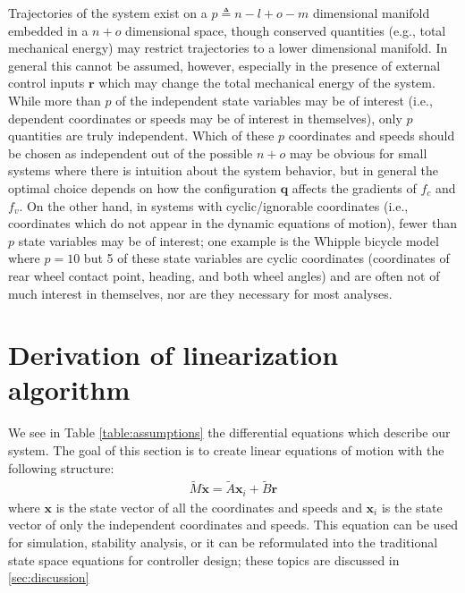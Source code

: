 \documentclass{svjour3}                     %
\begin{document}
Trajectories of the system exist on a $p \triangleq n - l + o - m$ dimensional
manifold embedded in a $n + o$ dimensional space, though conserved quantities
(e.g., total mechanical energy) may restrict trajectories to a lower
dimensional manifold.  In general this cannot be assumed, however, especially
in the presence of external control inputs $\bm{r}$ which may change the total
mechanical energy of the system.  While more than $p$ of the independent state
variables may be of interest (i.e., dependent coordinates or speeds may be of
interest in themselves), only $p$ quantities are truly independent.  Which of
these $p$ coordinates and speeds should be chosen as independent out of the
possible $n + o$ may be obvious for small systems where there is intuition
about the system behavior, but in general the optimal choice depends on how the
configuration $\bm{q}$ affects the gradients of $f_c$ and $f_v$.  On the other
hand, in systems with cyclic/ignorable coordinates (i.e., coordinates which do
not appear in the dynamic equations of motion), fewer than $p$ state
variables may be of interest; one example is the Whipple bicycle model where
$p=10$ but 5 of these state variables are cyclic coordinates (coordinates of
rear wheel contact point, heading, and both wheel angles) and are often not of
much interest in themselves, nor are they necessary for most analyses.

\section{Derivation of linearization algorithm}
\label{sec:derivations}

We see in Table \ref{table:assumptions} the differential equations which
describe our system. The goal of this section is to create linear equations
of motion with the following structure:
\begin{align}
    \label{eq:structure}
    \tilde{M} \dot{\bm{x}} = \tilde{A} \bm{x}_i + \tilde{B} \bm{r}
\end{align}
where $\bm{x}$ is the state vector of all the coordinates and speeds and
$\bm{x}_i$ is the state vector of only the independent coordinates and speeds.
This equation can be used for simulation, stability analysis,
or it can be reformulated into the traditional state space equations for
controller design; these topics are discussed in \ref{sec:discussion}
\end{document}
